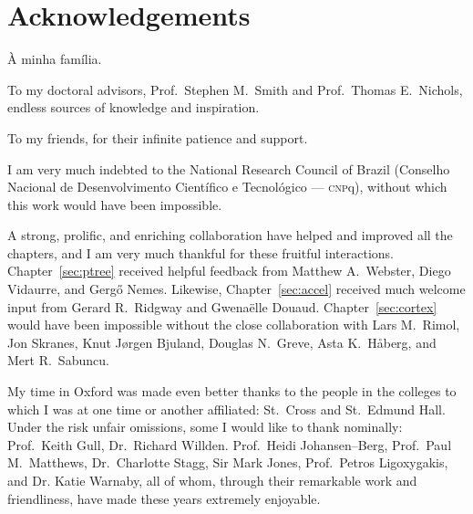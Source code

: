 \chapter*{Acknowledgements}
\setstretch{\lspac}

\noindent
\`{A} minha fam\'{i}lia.

\vspace{3mm}\noindent
To my doctoral advisors, Prof.\ Stephen M.\ Smith and Prof.\ Thomas E.\ Nichols, endless sources of knowledge and inspiration.

\vspace{3mm}\noindent
To my friends, for their infinite patience and support.

\vspace{3mm}\noindent
I am very much indebted to the National Research Council of Brazil (Conselho Nacional de Desenvolvimento Cient\'{i}fico e Tecnol\'{o}gico --- \textsc{cnp}q), without which this work would have been impossible.

\vspace{3mm}\noindent
A strong, prolific, and enriching collaboration have helped and improved all the chapters, and I am very much thankful for these fruitful interactions. Chapter~\ref{sec:ptree} received helpful feedback from Matthew A.\ Webster, Diego Vidaurre, and Gerg\H{o} Nemes. Likewise, Chapter~\ref{sec:accel} received much welcome input from Gerard R.\ Ridgway and Gwena\"{e}lle Douaud. Chapter~\ref{sec:cortex} would have been impossible without the close collaboration with Lars M.\ Rimol, Jon Skranes, Knut J\o{}rgen Bjuland, Douglas N.\ Greve, Asta K.\ H{\aa}berg, and Mert R.\ Sabuncu.

\vspace{3mm}\noindent
My time in Oxford was made even better thanks to the people in the colleges to which I was at one time or another affiliated: St.\ Cross and St.\ Edmund Hall. Under the risk unfair omissions, some I would like to thank nominally: Prof.\ Keith Gull, Dr.\ Richard Willden. Prof.\ Heidi Johansen--Berg, Prof.\ Paul M.\ Matthews, Dr.\ Charlotte Stagg, Sir Mark Jones, Prof.\ Petros Ligoxygakis, and Dr. Katie Warnaby, all of whom, through their remarkable work and friendliness, have made these years extremely enjoyable.

